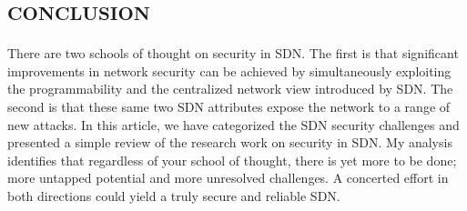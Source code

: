 %
\section*{\small \textsc{conclusion}}
There are two schools of thought on security in \ac{SDN}. The first is that significant improvements in network security can be achieved by simultaneously exploiting the programmability and the centralized network view introduced by \ac{SDN}. The second is that these same two \ac{SDN} attributes expose the network to a range of new attacks. In this article, we have categorized the \ac{SDN} security challenges and presented a simple review of the research work on security in \ac{SDN}. My analysis identifies that regardless of your school of thought, there is yet more to be done; more untapped potential and more unresolved challenges. A concerted effort in both directions could yield a truly secure and reliable \ac{SDN}.
